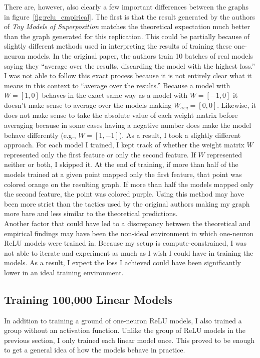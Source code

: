 \documentclass{article} %
\begin{document}
There are, however, also clearly a few important differences between the graphs in
figure~\ref{fig:relu_empirical}. The first is that the result generated by the
authors of \textit{Toy Models of Superposition} matches the theoretical
expectation much better than the graph generated for this replication. This could
be partially because of slightly different methods used in interpreting the results
of training these one-neuron models. In the original paper, the authors train
10 batches of real models saying they ``average over the results, discarding 
the model with the highest loss.'' I was not able to follow this exact process
because it is not entirely clear what it means in this context to ``average over
the results.'' Because a model with $W = [1, 0]$ behaves in the exact same way as
a model with
$W = [-1, 0]$ it doesn't make sense to average over the models making 
$W_{avg} = [0, 0]$. Likewise, it does not make sense to take the absolute value
of each weight matrix before averaging because in some cases having a negative
number does make the model behave differently (e.g., $W = [1, -1]$). As a result,
I took a slightly different approach. For each model I trained, I kept track of
whether the weight matrix $W$ represented only the first feature or only the second feature.
If $W$ represented neither or both, I skipped it. At the end of training, if more
than half of the models trained at a given point mapped only the first feature,
that point was colored orange on the resulting graph. If more than half the models
mapped only the second feature,
the point was colored purple. Using this method may have been more strict than
the tactics used by the original authors making my graph more bare and less similar to the
theoretical predictions.\\

Another factor that could have led to a discrepancy between the theoretical
and empirical findings may have been the non-ideal environment in which
one-neuron ReLU models were trained in. Because my setup is compute-constrained,
I was not able to iterate and experiment as much as I wish I could have in training 
the models. As a result, I expect the loss I achieved could have been significantly
lower in an ideal training environment.

\subsection{Training 100,000 Linear Models}

In addition to training a ground of one-neuron ReLU models, I also trained a group
without an activation function. Unlike the group of ReLU models in the previous
section, I only trained each linear model once. This proved to be enough to get
a general idea of how the models behave in practice. \\
\end{document}
